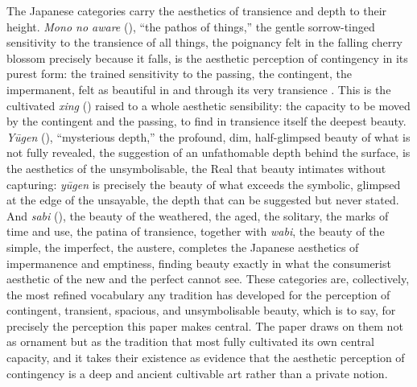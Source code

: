 The Japanese categories carry the aesthetics of transience and depth to their height. \emph{Mono no aware} (), ``the pathos of things,'' the gentle sorrow-tinged sensitivity to the transience of all things, the poignancy felt in the falling cherry blossom precisely because it falls, is the aesthetic perception of contingency in its purest form: the trained sensitivity to the passing, the contingent, the impermanent, felt as beautiful in and through its very transience \parencite{parkes1995}. This is the cultivated \emph{xing} () raised to a whole aesthetic sensibility: the capacity to be moved by the contingent and the passing, to find in transience itself the deepest beauty. \emph{Y\=ugen} (), ``mysterious depth,'' the profound, dim, half-glimpsed beauty of what is not fully revealed, the suggestion of an unfathomable depth behind the surface, is the aesthetics of the unsymbolisable, the Real that beauty intimates without capturing: \emph{y\=ugen} is precisely the beauty of what exceeds the symbolic, glimpsed at the edge of the unsayable, the depth that can be suggested but never stated. And \emph{sabi} (), the beauty of the weathered, the aged, the solitary, the marks of time and use, the patina of transience, together with \emph{wabi}, the beauty of the simple, the imperfect, the austere, completes the Japanese aesthetics of impermanence and emptiness, finding beauty exactly in what the consumerist aesthetic of the new and the perfect cannot see. These categories are, collectively, the most refined vocabulary any tradition has developed for the perception of contingent, transient, spacious, and unsymbolisable beauty, which is to say, for precisely the perception this paper makes central. The paper draws on them not as ornament but as the tradition that most fully cultivated its own central capacity, and it takes their existence as evidence that the aesthetic perception of contingency is a deep and ancient cultivable art rather than a private notion.

